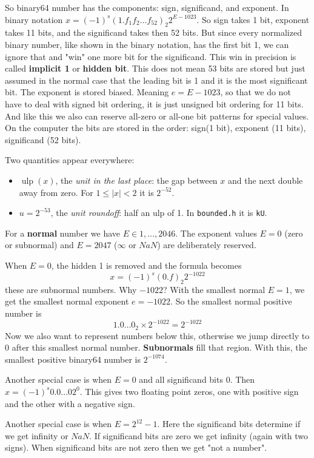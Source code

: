 \documentclass[11pt,a4paper]{article}
\newcommand{\code}[1]{\texttt{#1}}
\newcommand{\ulp}{\operatorname{ulp}}
\theoremstyle{definition}
\theoremstyle{remark}
\begin{document}
So binary64 number has the components: sign, significand, and exponent. In binary notation 
$x=(-1)^s (1.f_1f_2\dots f_{52})_2 2^{E-1023}$. So sign takes 1 bit, exponent takes 11 bits, and the significand 
takes then 52 bits. But since every normalized binary number, like shown in the binary notation, has the first bit 1, 
we can ignore that and "win" one more bit for the significand. This win in precision is called 
\textbf{implicit 1} or \textbf{hidden bit}. This does not mean 53 bits are stored but just 
assumed in the normal case that the leading bit is 1 and it is the most 
significant bit.
The exponent is stored biased. Meaning $e = E - 1023$, so that we do not have to deal 
with signed bit ordering, it is just unsigned bit ordering for 11 bits. And like this we also can 
reserve all-zero or all-one bit patterns for special values.
On the computer the bits are stored in the order: sign(1 bit), exponent (11 bits), significand (52 bits).


Two quantities appear everywhere:
\begin{itemize}
  \item $\ulp(x)$, the \emph{unit in the last place}: the gap between $x$ and the next double
    away from zero. For $1 \le |x| < 2$ it is $2^{-52}$.
  \item $u = 2^{-53}$, the \emph{unit roundoff}: half an ulp of 1. In \code{bounded.h} it is
    \code{kU}.
\end{itemize}

For a \textbf{normal} number we have $E \in 1, \dots, 2046$. The exponent values $E=0$ (zero or subnormal) and 
$E = 2047$ ($\infty$ or $NaN$) are deliberately reserved. 

When $E=0$, the hidden 1 is removed and the formula becomes
$$
x = (-1)^s (0.f)_2 2^{-1022}
$$
these are subnormal numbers. Why $-1022$? With the smallest normal $E=1$, we get 
the smallest normal exponent $e=-1022$. So the smallest normal positive number is 
$$
1.0\dots 0_2 \times 2^{-1022} = 2^{-1022}
$$
Now we also want to represent numbers below this, otherwise we jump directly to $0$ after this 
smallest normal number. \textbf{Subnormals} fill that region. With this, the smallest positive binary64 number is 
$2^{-1074}$.

Another special case is when $E=0$ and all significand bits 0. Then $x=(-1)^s 0.0\dots0 2^0$. This gives 
two floating point zeros, one with positive sign and the other with a negative sign.

Another special case is when $E = 2^{12} - 1$. Here the significand bits determine if we get infinity or $NaN$. 
If significand bits are zero we get infinity (again with two signs). When significand bits are not zero then 
we get "not a number".
\end{document}
